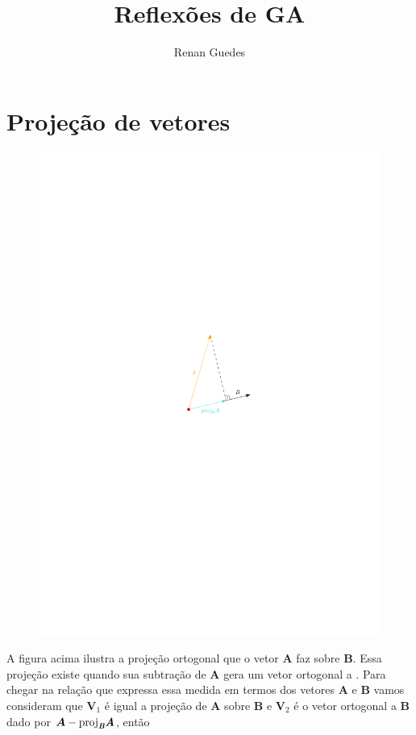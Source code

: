\documentclass[a4paper, 12pt, brazilian]{article}
\title{Reflexões de GA}
\author{Renan Guedes}
\newcommand{\bfit}[1]{\textit{\textbf{#1}}}
\newcommand{\proj}[2]{\textrm{proj}_{\bfit{#1}}\bfit{#2}}
\begin{document}
	\maketitle
	\section{Projeção de vetores}
	
	\begin{figure}[H]
		\centering
		\includegraphics[scale=1.1]{images/proj}
	\end{figure}
	
	A figura acima ilustra a projeção ortogonal que o vetor $\bm{A}$ faz sobre $\bm{B}$. Essa projeção existe quando sua subtração de $\bm{A}$ gera um vetor ortogonal a . Para chegar na relação que expressa essa medida em termos dos vetores $\bm{A}$ e $\bm{B}$ vamos consideram que $\bm{V}_{1}$ é igual a projeção de $\bm{A}$ sobre $\bm{B}$ e $\bm{V}_{2}$ é o vetor ortogonal a $\bm{B}$ dado por $\bm{A}-\proj{B}{A}$, então
	
\end{document}
